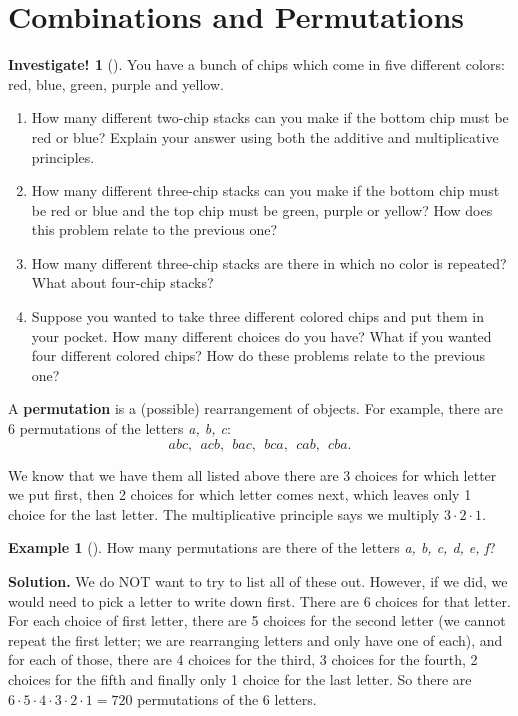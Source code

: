 \documentclass[10pt,]{book}
\newcommand{\terminology}[1]{\textbf{#1}}
\theoremstyle{plain}
\theoremstyle{definition}
\theoremstyle{definition}
\newtheorem{example}[theorem]{Example}
\theoremstyle{definition}
\newtheorem{investigation}[project]{Investigate!}
\theoremstyle{definition}
\numberwithin{equation}{chapter}
\begin{document}
\section[{Combinations and Permutations}]{Combinations and Permutations}\label{sec_counting-combperm}
\begin{investigation}[]\label{investigation-13}
\hypertarget{p-887}{}%
You have a bunch of chips which come in five different colors: red, blue, green, purple and yellow. %
\begin{enumerate}
\item\hypertarget{li-422}{}\hypertarget{p-888}{}%
How many different two-chip stacks can you make if the bottom chip must be red or blue? Explain your answer using both the additive and multiplicative principles.%
\item\hypertarget{li-423}{}\hypertarget{p-889}{}%
How many different three-chip stacks can you make if the bottom chip must be red or blue and the top chip must be green, purple or yellow? How does this problem relate to the previous one?%
\item\hypertarget{li-424}{}\hypertarget{p-890}{}%
How many different three-chip stacks are there in which no color is repeated? What about four-chip stacks?%
\item\hypertarget{li-425}{}\hypertarget{p-891}{}%
Suppose you wanted to take three different colored chips and put them in your pocket. How many different choices do you have? What if you wanted four different colored chips? How do these problems relate to the previous one?%
\end{enumerate}
%
\end{investigation}
\hypertarget{p-892}{}%
A \terminology{permutation} is a (possible) rearrangement of objects. For example, there are 6 permutations of the letters \emph{a, b, c}:%
\begin{equation*}
abc, ~~ acb, ~~ bac, ~~bca, ~~ cab, ~~ cba.
\end{equation*}
%
\par
\hypertarget{p-893}{}%
We know that we have them all listed above \textemdash{}there are 3 choices for which letter we put first, then 2 choices for which letter comes next, which leaves only 1 choice for the last letter. The multiplicative principle says we multiply \(3\cdot 2 \cdot 1\).%
\begin{example}[]\label{example-42}
\hypertarget{p-894}{}%
How many permutations are there of the letters \emph{a, b, c, d, e, f}?%
\par\smallskip%
\noindent\textbf{Solution.}\hypertarget{solution-96}{}\quad%
\hypertarget{p-895}{}%
We do NOT want to try to list all of these out. However, if we did, we would need to pick a letter to write down first. There are 6 choices for that letter. For each choice of first letter, there are 5 choices for the second letter (we cannot repeat the first letter; we are rearranging letters and only have one of each), and for each of those, there are 4 choices for the third, 3 choices for the fourth, 2 choices for the fifth and finally only 1 choice for the last letter. So there are \(6 \cdot 5 \cdot 4 \cdot 3 \cdot 2 \cdot 1 = 720\) permutations of the 6 letters.%
\end{example}
\end{document}
